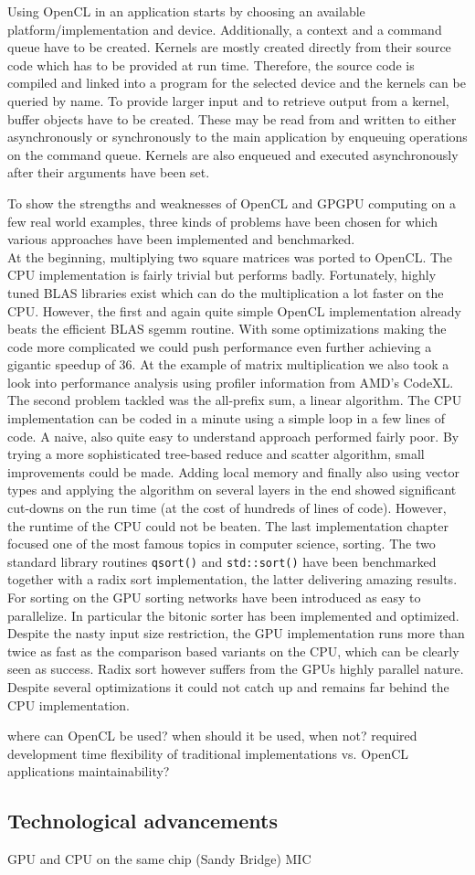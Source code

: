 Using OpenCL in an application starts by choosing an available platform/implementation and device. Additionally, a context and a command queue have to be created. Kernels are mostly created directly from their source code which has to be provided at run time. Therefore, the source code is compiled and linked into a program for the selected device and the kernels can be queried by name. To provide larger input and to retrieve output from a kernel, buffer objects have to be created. These may be read from and written to either asynchronously or synchronously to the main application by enqueuing operations on the command queue. Kernels are also enqueued and executed asynchronously after their arguments have been set.

To show the strengths and weaknesses of OpenCL and GPGPU computing on a few real world examples, three kinds of problems have been chosen for which various approaches have been implemented and benchmarked. \\
At the beginning, multiplying two square matrices was ported to OpenCL. The CPU implementation is fairly trivial but performs badly. Fortunately, highly tuned BLAS libraries exist which can do the multiplication a lot faster on the CPU. However, the first and again quite simple OpenCL implementation already beats the efficient BLAS sgemm routine. With some optimizations making the code more complicated we could push performance even further achieving a gigantic speedup of 36.
At the example of matrix multiplication we also took a look into performance analysis using profiler information from AMD's CodeXL.
The second problem tackled was the all-prefix sum, a linear algorithm. The CPU implementation can be coded in a minute using a simple loop in a few lines of code. A naive, also quite easy to understand approach performed fairly poor. By trying a more sophisticated tree-based reduce and scatter algorithm, small improvements could be made. Adding local memory and finally also using vector types and applying the algorithm on several layers in the end showed significant cut-downs on the run time (at the cost of hundreds of lines of code). However, the runtime of the CPU could not be beaten.
The last implementation chapter focused one of the most famous topics in computer science, sorting. The two standard library routines \lstinline!qsort()! and \lstinline!std::sort()! have been benchmarked together with a radix sort implementation, the latter delivering amazing results. For sorting on the GPU sorting networks have been introduced as easy to parallelize. In particular the bitonic sorter has been implemented and optimized. Despite the nasty input size restriction, the GPU implementation runs more than twice as fast as the comparison based variants on the CPU, which can be clearly seen as success. Radix sort however suffers from the GPUs highly parallel nature. Despite several optimizations it could not catch up and remains far behind the CPU implementation.


where can OpenCL be used?
when should it be used, when not?
required development time
flexibility of traditional implementations vs. OpenCL applications
maintainability?

\subsection{Technological advancements}
GPU and CPU on the same chip (Sandy Bridge)
MIC